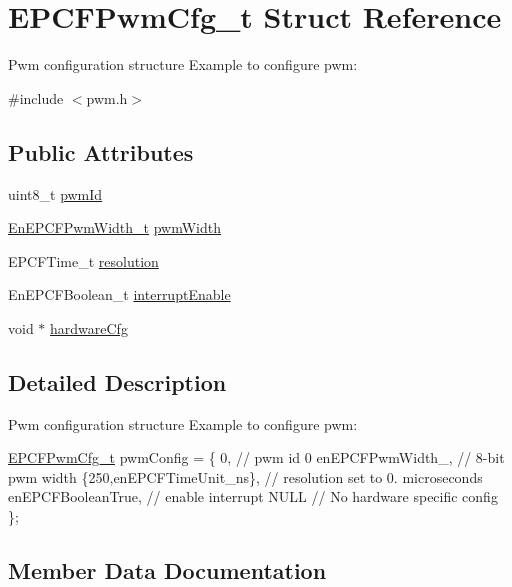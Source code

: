 \hypertarget{structEPCFPwmCfg__t}{}\section{E\+P\+C\+F\+Pwm\+Cfg\+\_\+t Struct Reference}
\label{structEPCFPwmCfg__t}


Pwm configuration structure Example to configure pwm\+:  




{\ttfamily \#include $<$pwm.\+h$>$}

\subsection*{Public Attributes}
\begin{DoxyCompactItemize}
\item 
uint8\+\_\+t \mbox{\hyperlink{structEPCFPwmCfg__t_aae8573680c5550161c6b4b057983cc08}{pwm\+Id}}
\item 
\mbox{\hyperlink{pwm_8h_adc2248862ed98f44dfc603f88fee97be}{En\+E\+P\+C\+F\+Pwm\+Width\+\_\+t}} \mbox{\hyperlink{structEPCFPwmCfg__t_a3b231f06daf2114252bafcaaf953fbfb}{pwm\+Width}}
\item 
E\+P\+C\+F\+Time\+\_\+t \mbox{\hyperlink{structEPCFPwmCfg__t_af87e716fc1cbe8316b4b69923b7e9b73}{resolution}}
\item 
En\+E\+P\+C\+F\+Boolean\+\_\+t \mbox{\hyperlink{structEPCFPwmCfg__t_af2a23b801262e2e4d3e46aab36729f6e}{interrupt\+Enable}}
\item 
void $\ast$ \mbox{\hyperlink{structEPCFPwmCfg__t_a70a240b5d4b540336cccf1f5b4b0f55f}{hardware\+Cfg}}
\end{DoxyCompactItemize}


\subsection{Detailed Description}
Pwm configuration structure Example to configure pwm\+: 

\mbox{\hyperlink{structEPCFPwmCfg__t}{E\+P\+C\+F\+Pwm\+Cfg\+\_\+t}} pwm\+Config = \{ 0, // pwm id 0 en\+E\+P\+C\+F\+Pwm\+Width\+\_, // 8-\/bit pwm width \{250,en\+E\+P\+C\+F\+Time\+Unit\+\_\+ns\}, // resolution set to 0. microseconds en\+E\+P\+C\+F\+Boolean\+True, // enable interrupt N\+U\+LL // No hardware specific config \}; 

\subsection{Member Data Documentation}
\mbox{\label{structEPCFPwmCfg__t_a70a240b5d4b540336cccf1f5b4b0f55f}} 
